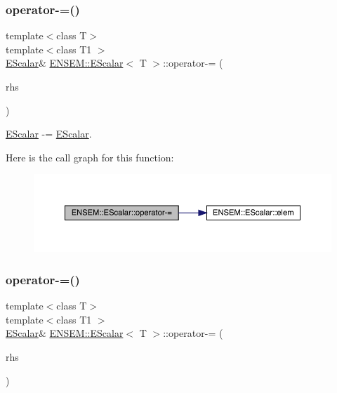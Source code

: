 \subsubsection{\texorpdfstring{operator-\/=()}{operator-=()}\hspace{0.1cm}{\footnotesize\ttfamily [1/3]}}
{\footnotesize\ttfamily template$<$class T$>$ \\
template$<$class T1 $>$ \\
\mbox{\hyperlink{classENSEM_1_1EScalar}{E\+Scalar}}\& \mbox{\hyperlink{classENSEM_1_1EScalar}{E\+N\+S\+E\+M\+::\+E\+Scalar}}$<$ T $>$\+::operator-\/= (\begin{DoxyParamCaption}\item[{const \mbox{\hyperlink{classENSEM_1_1EScalar}{E\+Scalar}}$<$ T1 $>$ \&}]{rhs }\end{DoxyParamCaption})\hspace{0.3cm}{\ttfamily [inline]}}



\mbox{\hyperlink{classENSEM_1_1EScalar}{E\+Scalar}} -\/= \mbox{\hyperlink{classENSEM_1_1EScalar}{E\+Scalar}}. 

Here is the call graph for this function\+:
\nopagebreak
\begin{figure}[H]
\begin{center}
\leavevmode
\includegraphics[width=350pt]{d0/d82/classENSEM_1_1EScalar_a2ed33688ab765d0e4d15b391b3f61f33_cgraph}
\end{center}
\end{figure}
\mbox{\label{classENSEM_1_1EScalar_a2ed33688ab765d0e4d15b391b3f61f33}} 
\subsubsection{\texorpdfstring{operator-\/=()}{operator-=()}\hspace{0.1cm}{\footnotesize\ttfamily [2/3]}}
{\footnotesize\ttfamily template$<$class T$>$ \\
template$<$class T1 $>$ \\
\mbox{\hyperlink{classENSEM_1_1EScalar}{E\+Scalar}}\& \mbox{\hyperlink{classENSEM_1_1EScalar}{E\+N\+S\+E\+M\+::\+E\+Scalar}}$<$ T $>$\+::operator-\/= (\begin{DoxyParamCaption}\item[{const \mbox{\hyperlink{classENSEM_1_1EScalar}{E\+Scalar}}$<$ T1 $>$ \&}]{rhs }\end{DoxyParamCaption})\hspace{0.3cm}{\ttfamily [inline]}}



